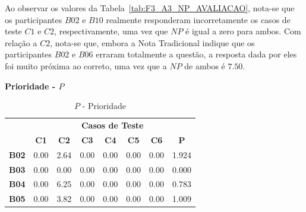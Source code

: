 Ao observar os valores da Tabela~\ref{tab:F3_A3_NP_AVALIACAO}, nota-se que os participantes $B02$ e $B10$ realmente responderam incorretamente os casos de teste $C1$ e $C2$, respectivamente, uma vez que $NP$ é igual a zero para ambos. Com relação a $C2$, nota-se que, embora a Nota Tradicional indique que os participantes $B02$ e $B06$ erraram totalmente a questão, a resposta dada por eles foi muito próxima ao correto, uma vez que a $NP$ de ambos é $7.50$.

\textbf{Prioridade - $P$}

\begin{table}[htbp]
	\centering
	\caption{$P$ - Prioridade}
	\begin{tabular}{|c|ccccccc|}
		\hline
		\rowcolor[HTML]{D0CECE} 
		\cellcolor[HTML]{D0CECE} & \multicolumn{7}{c|}{\cellcolor[HTML]{D0CECE}\textbf{Casos de Teste}} \\ \cline{2-8} 
		\rowcolor[HTML]{D9D9D9} 
		\multirow{-2}{*}{\cellcolor[HTML]{D0CECE}\textbf{Participante}} & \multicolumn{1}{c|}{\cellcolor[HTML]{D9D9D9}\textbf{C1}} & \multicolumn{1}{c|}{\cellcolor[HTML]{D9D9D9}\textbf{C2}} & \multicolumn{1}{c|}{\cellcolor[HTML]{D9D9D9}\textbf{C3}} & \multicolumn{1}{c|}{\cellcolor[HTML]{D9D9D9}\textbf{C4}} & \multicolumn{1}{c|}{\cellcolor[HTML]{D9D9D9}\textbf{C5}} & \multicolumn{1}{c|}{\cellcolor[HTML]{D9D9D9}\textbf{C6}} & \textbf{P} \\ \hline
		\textbf{B02} & \multicolumn{1}{c|}{0.00} & \multicolumn{1}{c|}{2.64} & \multicolumn{1}{c|}{0.00} & \multicolumn{1}{c|}{0.00} & \multicolumn{1}{c|}{0.00} & \multicolumn{1}{c|}{0.00} & 1.924 \\ \hline
		\rowcolor[HTML]{F2F2F2} 
		\textbf{B03} & \multicolumn{1}{c|}{\cellcolor[HTML]{F2F2F2}0.00} & \multicolumn{1}{c|}{\cellcolor[HTML]{F2F2F2}0.00} & \multicolumn{1}{c|}{\cellcolor[HTML]{F2F2F2}0.00} & \multicolumn{1}{c|}{\cellcolor[HTML]{F2F2F2}0.00} & \multicolumn{1}{c|}{\cellcolor[HTML]{F2F2F2}0.00} & \multicolumn{1}{c|}{\cellcolor[HTML]{F2F2F2}0.00} & 0.000 \\ \hline
		\textbf{B04} & \multicolumn{1}{c|}{0.00} & \multicolumn{1}{c|}{6.25} & \multicolumn{1}{c|}{0.00} & \multicolumn{1}{c|}{0.00} & \multicolumn{1}{c|}{0.00} & \multicolumn{1}{c|}{0.00} & 0.783 \\ \hline
		\rowcolor[HTML]{F2F2F2} 
		\textbf{B05} & \multicolumn{1}{c|}{\cellcolor[HTML]{F2F2F2}0.00} & \multicolumn{1}{c|}{\cellcolor[HTML]{F2F2F2}3.82} & \multicolumn{1}{c|}{\cellcolor[HTML]{F2F2F2}0.00} & \multicolumn{1}{c|}{\cellcolor[HTML]{F2F2F2}0.00} & \multicolumn{1}{c|}{\cellcolor[HTML]{F2F2F2}0.00} & \multicolumn{1}{c|}{\cellcolor[HTML]{F2F2F2}0.00} & 1.009 \\ \hline

\end{tabular}
\end{table}
